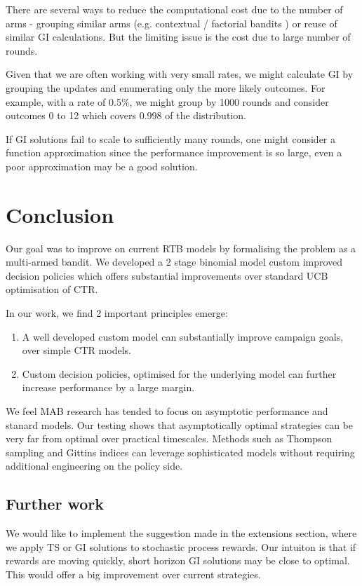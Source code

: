 \documentclass[11pt,a4,singlespacing,titlepagenumber=on]{scrreprt}
\numberwithin{equation}{chapter} %
\theoremstyle{remark}
\begin{document}
There are several ways to reduce the computational cost due to the number of arms - grouping similar arms (e.g. contextual / factorial bandits ) or reuse of similar GI calculations. But the limiting issue is the cost due to large number of rounds.

Given that we are often working with very small rates, we might calculate GI by grouping the updates and enumerating only the more likely outcomes. For example, with a rate of 0.5\%, we might group by 1000 rounds and consider outcomes 0 to 12 which covers 0.998 of the distribution. 

If GI solutions fail to scale to sufficiently many rounds, one might consider a function approximation since the performance improvement is so large, even a poor approximation may be a good solution.


\chapter{Conclusion}

Our goal was to improve on current RTB models by formalising the problem as a multi-armed bandit. We developed a 2 stage binomial model custom improved decision policies which offers substantial improvements over standard UCB optimisation of CTR. 

In our work, we find 2 important principles emerge:
\begin{enumerate}
	\item A well developed custom model can substantially improve campaign goals, over simple CTR models.
	\item Custom decision policies, optimised for the underlying model can further increase performance by a large margin.
\end{enumerate}

We feel MAB research has tended to focus on asymptotic performance and stanard models. Our testing shows that asymptotically optimal strategies can be very far from optimal over practical timescales. Methods such as Thompson sampling and Gittins indices can leverage sophisticated models without requiring additional engineering on the policy side.


\section{Further work}

We would like to implement the suggestion made in the extensions section, where we apply TS or GI solutions to stochastic process rewards. Our intuiton is that if rewards are moving quickly, short horizon GI solutions may be close to optimal. This would offer a big improvement over current strategies.
\end{document}
